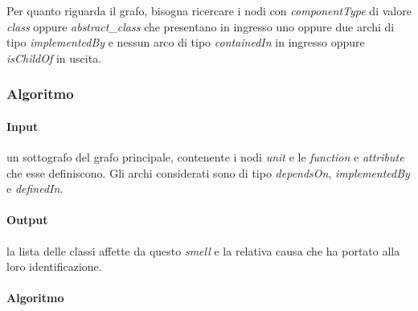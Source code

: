 \begin{itemize}
            Per quanto riguarda il grafo, bisogna ricercare i nodi con \textit{componentType} di valore \textit{class} oppure \textit{abstract\_class} che presentano in ingresso uno oppure due archi di tipo \textit{implementedBy} e nessun arco di tipo \textit{containedIn} in ingresso oppure \textit{isChildOf} in uscita.
        \end{itemize}
        
    \subsubsection{Algoritmo}
        \paragraph{Input} un sottografo del grafo principale, contenente i nodi \textit{unit} e le \textit{function} e \textit{attribute} che esse definiscono. Gli archi considerati sono di tipo \textit{dependsOn}, \textit{implementedBy} e \textit{definedIn}. 
        
        \paragraph{Output} la lista delle classi affette da questo \textit{smell} e la relativa causa che ha portato alla loro identificazione. 
        
        \paragraph{Algoritmo}
            
    